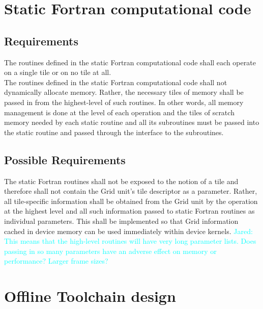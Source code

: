 \documentclass{article}
\newcommand{\Jared}[1]          {\textcolor{cyan}{Jared: #1}}
\begin{document}
\section{Static Fortran computational code}
\subsection{Requirements}
The routines defined in the static Fortran computational code shall each operate
on a single tile or on no tile at all.\\

The routines defined in the static Fortran computational code shall not
dynamically allocate memory.  Rather, the necessary tiles of memory shall be
passed in from the highest-level of such routines.  In other words, all memory
management is done at the level of each operation and the tiles of scratch
memory needed by each static routine and all its subroutines must be passed into
the static routine and passed through the interface to the subroutines.

\subsection{Possible Requirements}
The static Fortran routines shall not be exposed to the notion of a tile and
therefore shall not contain the Grid unit's tile descriptor as a parameter.
Rather, all tile-specific information shall be obtained from the Grid unit by
the operation at the highest level and all such information passed to static
Fortran routines as individual parameters.  This shall be implemented so that
Grid information cached in device memory can be used immediately within device
kernels.  \Jared{This means that the high-level routines will have very
long parameter lists.  Does passing in so many parameters have an adverse effect
on memory or performance?  Larger frame sizes?}

\section{Offline Toolchain design}
\end{document}
